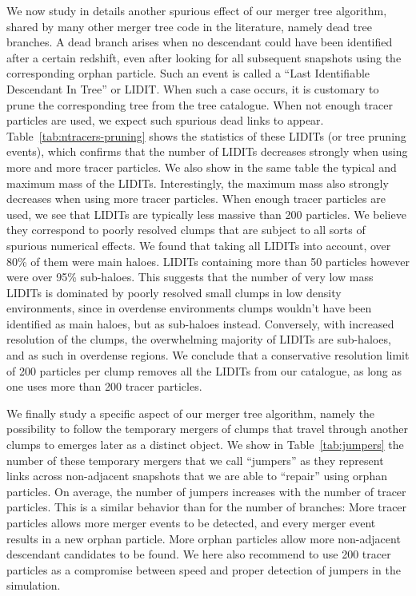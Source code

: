 We now study in details another spurious effect of our merger tree
algorithm, shared by many other merger tree code in the literature,
namely dead tree branches.  A dead branch arises when no descendant
could have been identified after a certain redshift, even after
looking for all subsequent snapshots using the corresponding orphan
particle. Such an event is called a ``Last Identifiable Descendant In
Tree'' or LIDIT.  When such a case occurs, it is customary to prune
the corresponding tree from the tree catalogue. When not enough tracer
particles are used, we expect such spurious dead links to
appear. Table~\ref{tab:ntracers-pruning} shows the statistics of these
LIDITs (or tree pruning events), which confirms that the number of
LIDITs decreases strongly when using more and more tracer
particles. We also show in the same table the typical and maximum mass
of the LIDITs. Interestingly, the maximum mass also strongly decreases
when using more tracer particles. When enough tracer particles are
used, we see that LIDITs are typically less massive than 200
particles. We believe they correspond to poorly resolved clumps that
are subject to all sorts of spurious numerical effects. We found that
taking all LIDITs into account, over 80\% of them were main haloes.
LIDITs containing more than 50 particles however were over 95\% sub-haloes.
This suggests that the number of very low mass LIDITs is dominated
by poorly resolved small clumps in low density environments, since
in overdense environments clumps wouldn't have been identified as main 
haloes, but as sub-haloes instead. Conversely, with increased resolution 
of the clumps, the overwhelming majority of LIDITs are sub-haloes, and as
such in overdense regions. We conclude that a
conservative resolution limit of 200 particles per clump removes all the
LIDITs from our catalogue, as long as one uses more than 200 tracer
particles. 

We finally study a specific aspect of our merger tree algorithm,
namely the possibility to follow the temporary mergers of clumps that
travel through another clumps to emerges later as a distinct object.
We show in Table~\ref{tab:jumpers} the number of these temporary
mergers that we call ``jumpers'' as they represent links across
non-adjacent snapshots that we are able to ``repair'' using orphan
particles. On average, the number of jumpers increases with the
number of tracer particles. This is a similar behavior than for the
number of branches: More tracer particles allows more merger events to
be detected, and every merger event results in a new orphan particle.
More orphan particles allow more non-adjacent descendant candidates
to be found. We here also recommend to use 200 tracer particles as a
compromise between speed and proper detection of jumpers in the
simulation.

